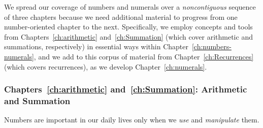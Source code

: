 We spread our coverage of numbers and numerals over a {\em noncontiguous} sequence of three chapters because we need additional material to progress from one number-oriented chapter to the next.  Specifically, we employ concepts and tools from Chapters~\ref{ch:arithmetic} and~\ref{ch:Summation} (which cover arithmetic and summations, respectively) in essential ways within Chapter~\ref{ch:numbers-numerals}, and we add to this corpus of material from Chapter~\ref{ch:Recurrences} (which covers recurrences), as we develop Chapter~\ref{ch:numerals}.


\subsubsection{Chapters~\ref{ch:arithmetic} and~\ref{ch:Summation}:
Arithmetic and Summation}

Numbers are important in our daily lives only when we {\em use} and {\em manipulate} them.

